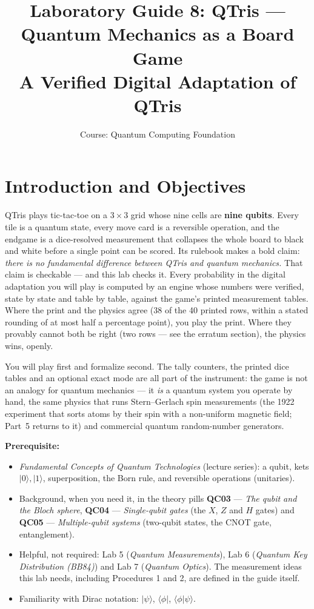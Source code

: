 \documentclass[a4paper,11pt]{article}
\title{\textbf{Laboratory Guide 8: QTris --- Quantum Mechanics as a Board Game}\\
\large A Verified Digital Adaptation of QTris}
\author{Course: Quantum Computing Foundation}
\date{}
\providecommand{\ket}[1]{|#1\rangle}
\providecommand{\bra}[1]{\langle#1|}
\providecommand{\braket}[2]{\langle#1|#2\rangle}
\begin{document}
\maketitle

\section{Introduction and Objectives}

QTris plays tic-tac-toe on a $3 \times 3$ grid whose nine cells are \textbf{nine
qubits}. Every tile is a quantum state, every move card is a reversible operation, and
the endgame is a dice-resolved measurement that collapses the whole board to black and
white before a single point can be scored. Its rulebook makes a bold claim: \emph{there
is no fundamental difference between QTris and quantum mechanics.} That claim is
checkable --- and this lab checks it. Every probability in the digital adaptation you
will play is computed by an engine whose numbers were verified, state by state and table
by table, against the game's printed measurement tables. Where the print and the physics
agree (38 of the 40 printed rows, within a stated rounding of at most half a percentage
point), you play the print. Where they provably cannot both be right (two rows --- see
the erratum section), the physics wins, openly.

You will play first and formalize second. The tally counters, the printed dice tables
and an optional exact mode are all part of the instrument: the game is not an analogy
for quantum mechanics --- it \emph{is} a quantum system you operate by hand, the same
physics that runs Stern--Gerlach spin measurements (the 1922 experiment that sorts atoms by
their spin with a non-uniform magnetic field; Part~5 returns to it) and commercial quantum
random-number generators.

\vspace{0.3cm}
\noindent\textbf{Prerequisite:}
\begin{itemize}
    \item \textit{Fundamental Concepts of Quantum Technologies} (lecture series): a
          qubit, kets $\ket{0}, \ket{1}$, superposition, the Born rule, and reversible
          operations (unitaries).
    \item Background, when you need it, in the theory pills \textbf{QC03} ---
          \textit{The qubit and the Bloch sphere}, \textbf{QC04} --- \textit{Single-qubit
          gates} (the $X$, $Z$ and $H$ gates) and \textbf{QC05} --- \textit{Multiple-qubit
          systems} (two-qubit states, the CNOT gate, entanglement).
    \item Helpful, not required: Lab 5 (\textit{Quantum Measurements}), Lab 6
          (\textit{Quantum Key Distribution (BB84)}) and Lab 7 (\textit{Quantum Optics}).
          The measurement ideas this lab needs, including Procedures 1 and 2, are
          defined in the guide itself.
    \item Familiarity with Dirac notation: $\ket{\psi}$, $\bra{\phi}$, $\braket{\phi}{\psi}$.
\end{itemize}
\end{document}
